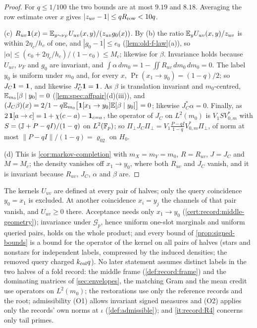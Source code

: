 \begin{proof}
For $q\le1/100$ the two bounds are at most $9.19$ and $8.18$. Averaging the row
estimate over $x$ gives $|z_{uv}-1|\le qR_{\rm row}<10q$.

(c) $R_{uv}\mathbf 1(x)=\mathbb E_{y\sim\nu_F}U_{uv}(x,y)/(z_{uv}g_0(x))$. By (b) the ratio
$\mathbb E_yU_{uv}(x,y)/z_{uv}$ is within $2\eta_c/h_c$ of one, and
$|g_0-1|\le e_0$ (\cref{lem:old-f-law}(a)), so
$|\alpha|\le(e_0+2\eta_c/h_c)/(1-e_0)\le M_c$; likewise for $\beta$. Invariance
holds because $U_{uv}$, $\nu_F$ and $g_0$ are invariant, and
$\int\alpha\,dm_0=1-\iint R_{uv}\,dm_0\,dm_0=0$. The label $y_0$ is uniform under
$m_0$ and, for every $x$, $\Pr(x_1\to y_0)=(1-q)/2$; so $J_C\mathbf 1=\mathbf 1$, and likewise
$J_C^*\mathbf 1=\mathbf 1$. As $\beta$ is translation invariant and $m_0$-centred,
$\mathbb E_{m_0}[\beta\mid y_0]=0$ (\cref{lem:spec:affpair}(d)(iii)), and
$(J_C\beta)(x)=2/1-q\mathbb E_{m_0}\bigl[\mathbf 1[x_1\to y_0]\mathbb E[\beta\mid y_0]\bigr]=0$;
likewise $J_C^*\alpha=0$. Finally, as $2\,\mathbf 1[a\to c]=1+\chi(c-a)-\mathbf 1_{c=a}$,
the operator of $J_C$ on $L^2(m_0)$ is $V_1SV^*_{0,m}$ with
$S=(\mathbb J+P-qI)/(1-q)$ on $L^2(\mathbb F_p)$; so
$\Pi_\perp J_C\Pi_\perp=V_1\frac{P-qI}{1-q}V^*_{0,m}\Pi_\perp$, of norm at most
$\|P-qI\|/(1-q)=\varrho_{02}$ on $H_0$.

(d) This is \cref{cor:markov-completion} with $m_X=m_Y=m_0$, $R=R_{uv}$,
$J=J_C$ and $M=M_c$; the density vanishes off $x_1\to y_0$, where both
$R_{uv}$ and $J_C$ vanish, and it is invariant because $R_{uv}$, $J_C$, $\alpha$
and $\beta$ are.
\end{proof}

\begin{remark}
The kernels $U_{uv}$ are defined at every pair of halves; only the query
coincidence $y_0=x_1$ is excluded. At another coincidence $x_i=y_j$ the
channels of that pair vanish, and $U_{uv}\ge0$ there. Acceptance needs only
$x_1\to y_0$ (\cref{cert:record:middle-geometry}); invariance under
$\mathcal G_p$, hence uniform one-slot marginals and uniform queried pairs,
holds on the whole product; and every bound of \cref{prop:signed-bounds} is a
bound for the operator of the kernel on all pairs of halves (stars and
nonstars for independent labels, compressed by the induced densities; the
removed query charged $k_{\rm col}q$). No later statement assumes distinct
labels in the two halves of a fold record: the middle frame (\cref{def:record:frame}) and the dominating matrices of \cref{sec:envelopes}, the
matching Gram and the mean credit use operators on $L^2(m_0)$; the
restorations use only the reference records and the root; admissibility
(O1) allows invariant signed measures and (O2) applies only the records' own
norms at $\iota$ (\cref{def:admissible}); and \ref{it:record:R4} concerns only
tail primes.
\end{remark}

